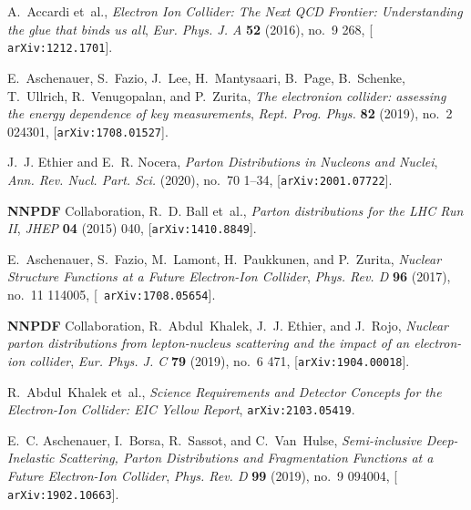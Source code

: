 \documentclass[11pt,a4paper]{article}
\begin{document}
\providecommand{\href}[2]{#2}\begingroup\raggedright\begin{thebibliography}{10}

  A.~Accardi et~al., {\it {Electron Ion Collider: The Next QCD Frontier}:
    {Understanding the glue that binds us all}},  {\em Eur. Phys. J. A} {\bf 52}
    (2016), no.~9 268, [\href{http://arxiv.org/abs/1212.1701}{{\tt
    arXiv:1212.1701}}].
  
  E.~Aschenauer, S.~Fazio, J.~Lee, H.~Mantysaari, B.~Page, B.~Schenke,
    T.~Ullrich, R.~Venugopalan, and P.~Zurita, {\it {The electron\textendash{}ion
    collider: assessing the energy dependence of key measurements}},  {\em Rept.
    Prog. Phys.} {\bf 82} (2019), no.~2 024301,
    [\href{http://arxiv.org/abs/1708.01527}{{\tt arXiv:1708.01527}}].
  
  J.~J. Ethier and E.~R. Nocera, {\it {Parton Distributions in Nucleons and
    Nuclei}},  {\em Ann. Rev. Nucl. Part. Sci.} (2020), no.~70 1--34,
    [\href{http://arxiv.org/abs/2001.07722}{{\tt arXiv:2001.07722}}].
  
  {\bf NNPDF} Collaboration, R.~D. Ball et~al., {\it {Parton distributions for
    the LHC Run II}},  {\em JHEP} {\bf 04} (2015) 040,
    [\href{http://arxiv.org/abs/1410.8849}{{\tt arXiv:1410.8849}}].
  
  E.~Aschenauer, S.~Fazio, M.~Lamont, H.~Paukkunen, and P.~Zurita, {\it {Nuclear
    Structure Functions at a Future Electron-Ion Collider}},  {\em Phys. Rev. D}
    {\bf 96} (2017), no.~11 114005, [\href{http://arxiv.org/abs/1708.05654}{{\tt
    arXiv:1708.05654}}].
  
  {\bf NNPDF} Collaboration, R.~Abdul~Khalek, J.~J. Ethier, and J.~Rojo, {\it
    {Nuclear parton distributions from lepton-nucleus scattering and the impact
    of an electron-ion collider}},  {\em Eur. Phys. J. C} {\bf 79} (2019), no.~6
    471, [\href{http://arxiv.org/abs/1904.00018}{{\tt arXiv:1904.00018}}].
  
  R.~Abdul~Khalek et~al., {\it {Science Requirements and Detector Concepts for
    the Electron-Ion Collider: EIC Yellow Report}},
    \href{http://arxiv.org/abs/2103.05419}{{\tt arXiv:2103.05419}}.
  
  E.~C. Aschenauer, I.~Borsa, R.~Sassot, and C.~Van~Hulse, {\it {Semi-inclusive
    Deep-Inelastic Scattering, Parton Distributions and Fragmentation Functions
    at a Future Electron-Ion Collider}},  {\em Phys. Rev. D} {\bf 99} (2019),
    no.~9 094004, [\href{http://arxiv.org/abs/1902.10663}{{\tt
    arXiv:1902.10663}}].
  

\end{thebibliography}
\end{document}
